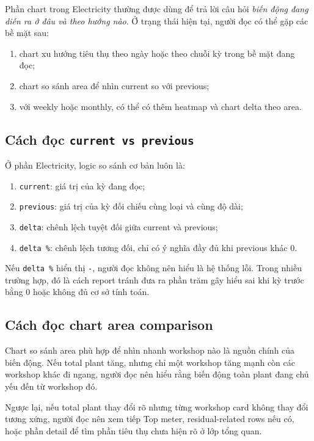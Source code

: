 Phần chart trong Electricity thường được dùng để trả lời câu hỏi \textit{biến động đang diễn ra ở đâu và theo hướng nào}. Ở trạng thái hiện tại, người đọc có thể gặp các bề mặt sau:

\begin{enumerate}[label=-]
\item chart xu hướng tiêu thụ theo ngày hoặc theo chuỗi kỳ trong bề mặt đang đọc;
\item chart so sánh area để nhìn current so với previous;
\item với weekly hoặc monthly, có thể có thêm heatmap và chart delta theo area.
\end{enumerate}

\subsection{Cách đọc \texttt{current vs previous}}

Ở phần Electricity, logic so sánh cơ bản luôn là:

\begin{enumerate}[label=-]
\item \texttt{current}: giá trị của kỳ đang đọc;
\item \texttt{previous}: giá trị của kỳ đối chiếu cùng loại và cùng độ dài;
\item \texttt{delta}: chênh lệch tuyệt đối giữa current và previous;
\item \texttt{delta \%}: chênh lệch tương đối, chỉ có ý nghĩa đầy đủ khi previous khác 0.
\end{enumerate}

Nếu \texttt{delta \%} hiển thị \texttt{-}, người đọc không nên hiểu là hệ thống lỗi. Trong nhiều trường hợp, đó là cách report tránh đưa ra phần trăm gây hiểu sai khi kỳ trước bằng 0 hoặc không đủ cơ sở tính toán.

\subsection{Cách đọc chart area comparison}

Chart so sánh area phù hợp để nhìn nhanh workshop nào là nguồn chính của biến động. Nếu total plant tăng, nhưng chỉ một workshop tăng mạnh còn các workshop khác đi ngang, người đọc nên hiểu rằng biến động toàn plant đang chủ yếu đến từ workshop đó.

Ngược lại, nếu total plant thay đổi rõ nhưng từng workshop card không thay đổi tương xứng, người đọc nên xem tiếp Top meter, residual-related rows nếu có, hoặc phần detail để tìm phần tiêu thụ chưa hiện rõ ở lớp tổng quan.

